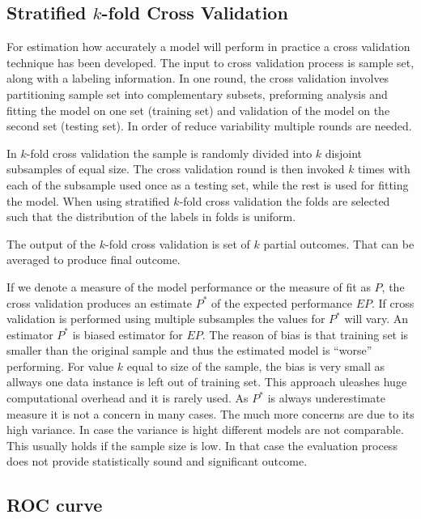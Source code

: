 \subsection{Stratified $k$-fold Cross Validation}

For estimation how accurately a model will perform in practice a cross validation technique has been developed.
The input to cross validation process is sample set, along with a labeling information. 
In one round, the cross validation involves partitioning sample set into complementary subsets, preforming analysis
and fitting the model on one set (training set) and validation of the model on the second set (testing set).
In order of reduce variability multiple rounds are needed.

In $k$-fold cross validation the sample is randomly  divided into $k$ disjoint subsamples of equal size. 
The cross validation round is then invoked $k$ times with each of the subsample used once as a testing set,
while the rest is used for fitting the model. When using stratified $k$-fold cross validation the folds are selected
such that the distribution of the labels in folds is uniform.

The output of the $k$-fold cross validation is set of $k$ partial outcomes. That can be averaged to produce
final outcome.

If we denote a measure of the model performance or the measure of fit  as $P$, 
the cross validation produces an estimate $P^*$ of the
expected performance $EP$. If cross validation is performed using multiple subsamples the values for $P^*$
will vary. An estimator $P^*$ is biased estimator for $EP$. The reason of bias is that training set is smaller
than the original sample and thus the estimated model is ``worse'' performing. 
For value $k$ equal to size of the sample, the bias is very small as allways one data instance is left out of 
training set. This approach uleashes huge computational overhead and it is rarely used.
As $P^*$ is always underestimate measure it is not a concern in many cases.
The much more concerns are due to its high variance. In case the variance is hight different
models are not comparable. This usually holds if the sample size is low.
In that case the evaluation process does not provide statistically sound and significant outcome.

\subsection{ROC curve}\label{subsec:roc}

